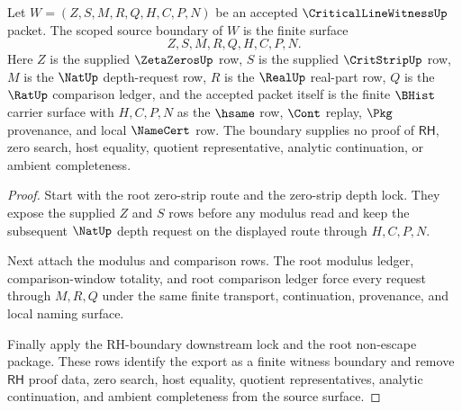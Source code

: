 \begin{theorem}
\label{thm:critical-line-witness-scoped-source-boundary}
Let $W=(Z,S,M,R,Q,H,C,P,N)$ be an accepted $\CriticalLineWitnessUp$ packet. The scoped source boundary of $W$ is the finite surface
$$
Z,S,M,R,Q,H,C,P,N.
$$
Here $Z$ is the supplied $\ZetaZerosUp$ row, $S$ is the supplied $\CritStripUp$ row, $M$ is the $\NatUp$ depth-request row, $R$ is the $\RealUp$ real-part row, $Q$ is the $\RatUp$ comparison ledger, and the accepted packet itself is the finite $\BHist$ carrier surface with $H,C,P,N$ as the $\hsame$ row, $\Cont$ replay, $\Pkg$ provenance, and local $\NameCert$ row. The boundary supplies no proof of $\mathsf{RH}$, zero search, host equality, quotient representative, analytic continuation, or ambient completeness.
\end{theorem}
\begin{proof}
Start with the root zero-strip route and the zero-strip depth lock. They expose the supplied $Z$ and $S$ rows before any modulus read and keep the subsequent $\NatUp$ depth request on the displayed route through $H,C,P,N$.

Next attach the modulus and comparison rows. The root modulus ledger, comparison-window totality, and root comparison ledger force every request through $M,R,Q$ under the same finite transport, continuation, provenance, and local naming surface.

Finally apply the RH-boundary downstream lock and the root non-escape package. These rows identify the export as a finite witness boundary and remove $\mathsf{RH}$ proof data, zero search, host equality, quotient representatives, analytic continuation, and ambient completeness from the source surface.
\end{proof}

